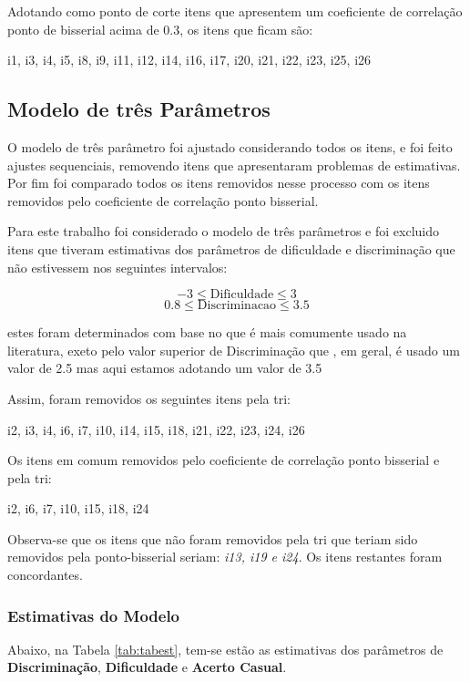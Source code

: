 \documentclass[]{article}
\begin{document}
Adotando como ponto de corte itens que apresentem um coeficiente de
correlação ponto de bisserial acima de 0.3, os itens que ficam são:

i1, i3, i4, i5, i8, i9, i11, i12, i14, i16, i17, i20, i21, i22, i23,
i25, i26

\subsection{Modelo de três Parâmetros}\label{modelo-de-tres-parametros}

O modelo de três parâmetro foi ajustado considerando todos os itens, e
foi feito ajustes sequenciais, removendo itens que apresentaram
problemas de estimativas. Por fim foi comparado todos os itens removidos
nesse processo com os itens removidos pelo coeficiente de correlação
ponto bisserial.

Para este trabalho foi considerado o modelo de três parâmetros e foi
excluido itens que tiveram estimativas dos parâmetros de dificuldade e
discriminação que não estivessem nos seguintes intervalos:

\[-3 \leq \text{Dificuldade} \leq 3\]
\[0.8 \leq \text{Discriminacao} \leq 3.5\]

estes foram determinados com base no que é mais comumente usado na
literatura, exeto pelo valor superior de Discriminação que , em geral, é
usado um valor de 2.5 mas aqui estamos adotando um valor de 3.5

Assim, foram removidos os seguintes itens pela tri:

i2, i3, i4, i6, i7, i10, i14, i15, i18, i21, i22, i23, i24, i26

Os itens em comum removidos pelo coeficiente de correlação ponto
bisserial e pela tri:

i2, i6, i7, i10, i15, i18, i24

Observa-se que os itens que não foram removidos pela tri que teriam sido
removidos pela ponto-bisserial seriam: \emph{i13, i19 e i24}. Os itens
restantes foram concordantes.

\subsubsection{Estimativas do Modelo}\label{estimativas-do-modelo}

Abaixo, na Tabela \ref{tab:tabest}, tem-se estão as estimativas dos
parâmetros de \textbf{Discriminação}, \textbf{Dificuldade} e
\textbf{Acerto Casual}.
\end{document}
